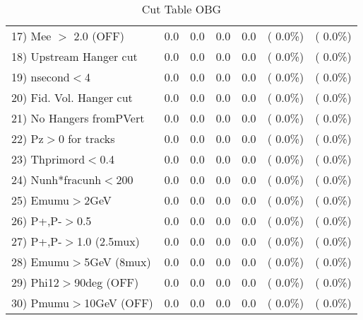 \begin{table}[h!]
\begin{tabular}{||l||r|r|r|r|r|r||}
 17) Mee $>$ 2.0  (OFF)   &          0.0 &          0.0 &          0.0 &          0.0 & (  0.0\%) & (  0.0\%) \\
 18) Upstream Hanger cut  &          0.0 &          0.0 &          0.0 &          0.0 & (  0.0\%) & (  0.0\%) \\
 19) nsecond$<$4          &          0.0 &          0.0 &          0.0 &          0.0 & (  0.0\%) & (  0.0\%) \\
 20) Fid. Vol. Hanger cut &          0.0 &          0.0 &          0.0 &          0.0 & (  0.0\%) & (  0.0\%) \\
 21) No Hangers fromPVert &          0.0 &          0.0 &          0.0 &          0.0 & (  0.0\%) & (  0.0\%) \\
 22) Pz$>$0 for tracks    &          0.0 &          0.0 &          0.0 &          0.0 & (  0.0\%) & (  0.0\%) \\
 23) Thprimord$<$0.4      &          0.0 &          0.0 &          0.0 &          0.0 & (  0.0\%) & (  0.0\%) \\
 24) Nunh*fracunh$<$200   &          0.0 &          0.0 &          0.0 &          0.0 & (  0.0\%) & (  0.0\%) \\
 25) Emumu$>$2GeV         &          0.0 &          0.0 &          0.0 &          0.0 & (  0.0\%) & (  0.0\%) \\
 26) P+,P-$>$0.5          &          0.0 &          0.0 &          0.0 &          0.0 & (  0.0\%) & (  0.0\%) \\
 27) P+,P-$>$1.0 (2.5mux) &          0.0 &          0.0 &          0.0 &          0.0 & (  0.0\%) & (  0.0\%) \\
 28) Emumu$>$5GeV  (8mux) &          0.0 &          0.0 &          0.0 &          0.0 & (  0.0\%) & (  0.0\%) \\
 29) Phi12$>$90deg  (OFF) &          0.0 &          0.0 &          0.0 &          0.0 & (  0.0\%) & (  0.0\%) \\
 30) Pmumu$>$10GeV  (OFF) &          0.0 &          0.0 &          0.0 &          0.0 & (  0.0\%) & (  0.0\%) \\
 \hline
 \hline
 \end{tabular}
 \caption{Cut Table  OBG      }
 \label{tab-cutcohjpsi-mumu_qe}
 \end{table}
